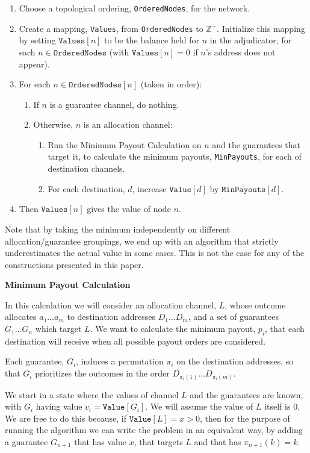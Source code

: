 \begin{enumerate}
  \item Choose a topological ordering, \texttt{OrderedNodes}, for the network.
  \item Create a mapping, \texttt{Values}, from \texttt{OrderedNodes} to $\mathbb{Z}^+$. Initialize this mapping by setting $\texttt{Values}[n]$ to be the balance held for $n$ in the adjudicator, for each $n \in \texttt{OrderedNodes}$ (with $\texttt{Values}[n] = 0$ if $n$'s address does not appear).
  \item For each $n \in \texttt{OrderedNodes}[n]$ (taken in order):
  \begin{enumerate}
    \item If $n$ is a guarantee channel, do nothing.
    \item Otherwise, $n$ is an allocation channel:
    \begin{enumerate}
      \item Run the Minimum Payout Calculation on $n$ and the guarantees that target it, to calculate the minimum payouts, \texttt{MinPayouts}, for each of destination channels.
      \item For each destination, $d$, increase $\texttt{Value}[d]$ by $\texttt{MinPayouts}[d]$.
    \end{enumerate}
  \end{enumerate}
  \item Then $\texttt{Values}[n]$ gives the value of node $n$.
\end{enumerate}

Note that by taking the minimum independently on different allocation/guarantee groupings, we end up with an algorithm that strictly underestimates the actual value in some cases.
This is not the case for any of the constructions presented in this paper.

\textbf{Minimum Payout Calculation}

In this calculation we will consider an allocation channel, $L$, whose outcome allocates $a_1 \dots a_m$ to destination addresses $D_1 \dots D_m$, and a set of guarantees $G_1 \dots G_n$ which target $L$.
We want to calculate the minimum payout, $p_i$, that each destination will receive when all possible payout orders are considered.

Each guarantee, $G_i$, induces a permutation $\pi_i$ on the destination addresses, so that $G_i$ prioritizes the outcomes in the order $D_{\pi_i(1)} \dots D_{\pi_i(m)}$.

We start in a state where the values of channel $L$ and the guarantees are known, with $G_i$ having value $v_i = \texttt{Value}[G_i]$.
We will assume the value of $L$ itself is 0. 
We are free to do this because, if $\texttt{Value}[L] = x > 0$, then for the purpose of running the algorithm we can write the problem in an equivalent way, by adding a guarantee $G_{n+1}$ that has value $x$, that targets $L$ and that has $\pi_{n+1}(k) = k$.

